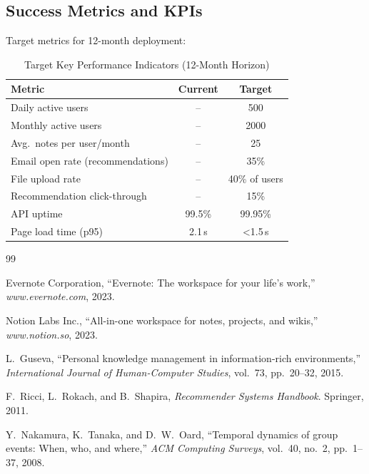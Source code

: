 \documentclass[10pt,twocolumn,a4paper]{article}
\begin{document}
\begin{table}[h]
\begin{enumerate}
\end{enumerate}

\subsection{Success Metrics and KPIs}

Target metrics for 12-month deployment:

\begin{table}[h]
\centering
\caption{Target Key Performance Indicators (12-Month Horizon)}
\label{tab:kpis}
\small
\begin{tabular}{|l|c|c|}
\hline
\textbf{Metric}                    & \textbf{Current} & \textbf{Target} \\
\hline
Daily active users                 & --               & 500 \\
Monthly active users               & --               & 2000 \\
Avg.\ notes per user/month         & --               & 25 \\
Email open rate (recommendations)  & --               & 35\% \\
File upload rate                   & --               & 40\% of users \\
Recommendation click-through       & --               & 15\% \\
API uptime                         & 99.5\%           & 99.95\% \\
Page load time (p95)               & 2.1\,s           & <1.5\,s \\
\hline
\end{tabular}


\begin{thebibliography}{99}

Evernote Corporation, ``Evernote: The workspace for your life's work,''
\textit{www.evernote.com}, 2023.

Notion Labs Inc., ``All-in-one workspace for notes, projects, and wikis,''
\textit{www.notion.so}, 2023.

L.~Guseva, ``Personal knowledge management in information-rich environments,''
\textit{International Journal of Human-Computer Studies}, vol.~73, pp.~20--32, 2015.

F.~Ricci, L.~Rokach, and B.~Shapira, \textit{Recommender Systems Handbook}.
Springer, 2011.

Y.~Nakamura, K.~Tanaka, and D.~W.~Oard,
``Temporal dynamics of group events: When, who, and where,''
\textit{ACM Computing Surveys}, vol.~40, no.~2, pp.~1--37, 2008.


\end{thebibliography}
\end{table}
\end{table}
\end{document}
